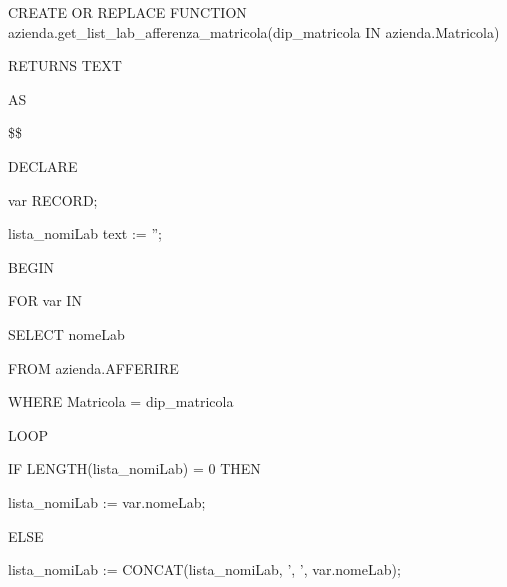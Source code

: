                         \begin{flushleft}
                            \begin{description}
                                \item CREATE OR REPLACE FUNCTION azienda.get\_list\_lab\_afferenza\_matricola(dip\_matricola IN azienda.Matricola)
                                \item RETURNS TEXT     
                                \item AS
                                \item \$\$
                                \item DECLARE
                                \begin{description}
                                    \item var RECORD;
                                    \item lista\_nomiLab text := '';
                                \end{description}
                                \item BEGIN 
                                \begin{description}
                                    \item FOR var IN
                                    \begin{description}
                                        \item SELECT nomeLab
                                        \item FROM azienda.AFFERIRE
                                        \item WHERE Matricola = dip\_matricola
                                    \end{description}
                                    \item LOOP
                                    \begin{description}

                                        \item IF LENGTH(lista\_nomiLab) = 0 THEN
                                        \begin{description}
                                            \item lista\_nomiLab := var.nomeLab;
                                        \end{description}

                                        \item ELSE
                                        \begin{description}
                                            \item lista\_nomiLab := CONCAT(lista\_nomiLab, ', ', var.nomeLab);
                                        \end{description}
                                            

\end{description}
\end{description}
\end{description}
\end{flushleft}
